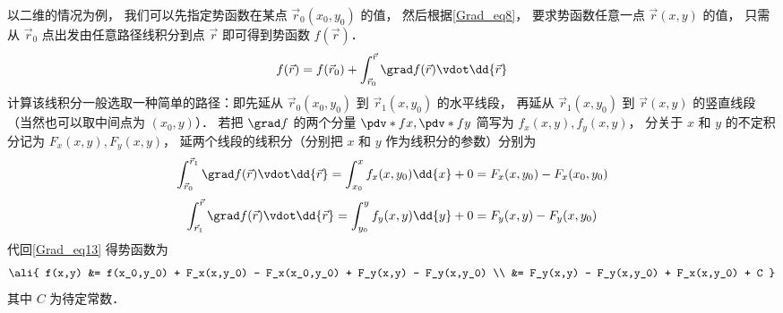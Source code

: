 以二维的情况为例， 我们可以先指定势函数在某点 $\vec r_0 (x_0,y_0)$ 的值， 然后根据\autoref{Grad_eq8}， 要求势函数任意一点 $\vec r (x,y)$ 的值， 只需从 $\vec r_0$ 点出发由任意路径线积分到点 $\vec r$ 即可得到势函数 $f(\vec r)$．
\begin{equation}\label{Grad_eq13}
f(\vec r) =  f(\vec r_0) + \int_{\vec r_0}^{\vec r} \grad f(\vec r) \vdot \dd{\vec r} 
\end{equation}
计算该线积分一般选取一种简单的路径：即先延从 $\vec r_0(x_0,y_0)$ 到 $\vec r_1(x, y_0)$ 的水平线段， 再延从 $\vec r_1(x, y_0)$ 到 $\vec r(x,y)$ 的竖直线段（当然也可以取中间点为 $(x_0,y)$）． 若把 $\grad f$ 的两个分量 $\pdv*{f}{x}, \pdv*{f}{y}$ 简写为 $f_x(x,y), f_y(x,y)$， 分关于 $x$ 和 $y$ 的不定积分记为 $F_x(x,y), F_y(x,y)$， 延两个线段的线积分（分别把 $x$ 和 $y$ 作为线积分的参数）分别为
\begin{equation}
 \int_{\vec r_0}^{\vec r_1} \grad f(\vec r) \vdot \dd{\vec r} = \int_{x_0}^{x} f_x(x,y_0) \dd{x} + 0 = F_x(x,y_0) - F_x(x_0,y_0)
\end{equation}
\begin{equation}
 \int_{\vec r_1}^{\vec r} \grad f(\vec r) \vdot \dd{\vec r} = \int_{y_0}^{y} f_y(x,y) \dd{y} + 0 = F_y(x,y) - F_y(x,y_0)
\end{equation}
代回\autoref{Grad_eq13} 得势函数为
\begin{equation}\label{Grad_eq23}\ali{
f(x,y) &= f(x_0,y_0) + F_x(x,y_0) - F_x(x_0,y_0) + F_y(x,y) - F_y(x,y_0) \\
&= F_y(x,y) - F_y(x,y_0) + F_x(x,y_0) + C
}\end{equation}
其中 $C$ 为待定常数．


